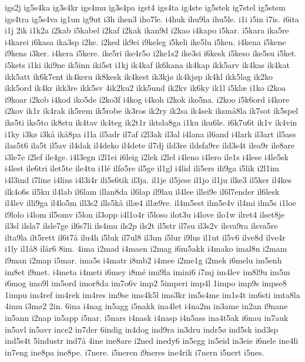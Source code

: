 igs2j
ig5s4ka
ig3s4kr
igs4mu
ig3s4pa
igst4
igs4ta
ig4ste
ig5stek
ig7stel
ig5stem
igs4tra
ig5s4va
ig1un
ig9ut
i3h
ihen3
iho7le.
i4huk
ihu9la
ihu5le.
i1i
i5in
i7is.
i6ita
i1j
2ik
i1k2a
i2kab
i5kabel
i2kaf
i2kak
ikan9d
i2kao
i4kapo
i5kar.
i5kara
ika5re
i4karei
i6kasa
ika3sp
i2ke.
i2ked
ik9ei
i9keleg
i5keli
ike5lu
i5ken.
i4kena
i5kene
i9kens
i3ker.
i4kera
i5kere.
ike5ri
ike4r5o
i2ke1s2
ike3si
i6kesk
i5keso
ike5su
i5ket.
i5kets
i1ki
iki9ne
ik5inn
iki5st
i1kj
ik4kaf
ik6kana
ik4kap
ikk5arv
ik4kas
ik4kat
ikk5att
ik6k7ent
ik4keru
ik8kesk
ik4kest
ik3kj^^f8
ik4kj^^f8p
ik4kl
ikk5lag
ik2ko
ikk5ord
ik4kr
ikk3re
ikk5sv
4ik2ku2
ikk5und
ik2kv
ik6ky
ik1l
i5kl^^e6
i1ko
i2koa
i9koar
i2kob
i4kod
iko5de
i2ko3f
i4kog
i4koh
i2kok
iko5na.
i2koo
i5k6ord
i4kore
i2kov
ik1r
ik4rak
ik5rem
ik5robe
ik3ros
ik2ry
ik2sa
ik4sek
iksm^^e58la
ik7sot
ik5spel
iks5ti
iks5to
ik8stu
ik4tav
ik4teg
ik2t1r
iktsla8ga
i1ku
iku6le.
i6k7u6t
ik1v
ik4vin
i1ky
i3k^^f8
i3k^^e5
ik^^e58pa
i1la
il5adr
il7af
i2l3ak
il3al
i4lana
il6and
i4lark
il3art
il5ass
ilas5t6
ila5t
il5av
il4dak
il4deko
il4dete
il7dj
ild3re
ildsfa9re
ild3s4t
ilea9r
ile8are
i3le7e
i2lef
ile4ge.
i4l3egn
i2l1ei
i6leig
i2lek
i2lel
i4leno
i4lero
ile1s
i4lese
i4le5sk
i4lest
ile6tri
ilet5te
ile4tu
i1l^^e9
ilf^^f85re
il5ge
il1gl
i4lid
ili5ers
ili9ga
i5lik
i2l1im
i4l3ind
i7line
i4lins
i4l3i4r
ili5s6tik
il3ja.
il1je
il5jese
il1jo
il1ju
ilke3
il5ker
il4kes
ilk4o6s
il5ku
il4lab
il6lam
illan8da
il6lap
il9lau
il4lee
illei9e
il6l7ender
il6lesk
il4lev
illi9ga
il4lo5m
ill3s2
ills5k^^e5
ill^^e64
ill^^e69re.
il4m5est
ilm5e4v
il4mi
ilm5s
i1loe
i9lolo
i4lom
il5omv
i5lon
il3opp
i4l1o4r
i5loso
ilot3u
i4love
ilo1w
ilret4
ilset8je
il3sl
ilsla7
ilsle7ge
il6s7li
ils4mu
ils2p
ils2t
il5str
il7su
il3s2v
ilsva9ra
ilsva5re
ilta9la
ilt5rett
il6t7^^e5
ilu4h
i5luk
il7ul8
il3un
i5lur
i9lus
il1ut
il5v6
ilve8d
ilve4r
i1ly
il1^^e58
il^^e5r6
8im.
4ima
i2mad
i4maen
i2mag
i6m5akk
i4mako
imal8n
i2mam
i9man
i2map
i5mar.
ima5s
i4matr
i8mb2
i4mee
i2me1g
i2mek
i6melu
im5enh
im8et
i9met.
i4meta
i4meti
i6mey
i8m^^e9
imi9la
imini6
i7mj
im4lev
im8l9u
im5m
i6mog
imo9l
im5ord
imor8da
im7o6v
imp2
5imperi
imp4l
1impo
imp9s
impse8
1impu
im4ref
im4rek
im4res
im9se
ims4k5l
ims3kr
im5s4me
im1s4t
im6sti
imta8la
4imu
i3m^^f82
2in.
6ina
i4nag
in5agg
i5nakk
ina4let
i4na2m
in3ame
in2an
i9nane
in5ann
i2nap
in5app
i5nar.
i5nars
i4nask
i4nasp
i4n5ass
ina4t5ak
i6nau
in7auk
in5avl
in5avr
ince2
in7der
6indig
in4dog
ind9ra
in3dru
indr5^^f8
ind5sk
ind3sp
ind5s4t
5industr
ind7^^e5
4ine
ine8are
i2ned
inedy6
in5egg
in5eid
in3eie
i6nele
ine4li
in7eng
ine8pa
ine8pe.
i7nere.
i5neren
i9neres
ine4rik
i7nern
i5nert
i5nes.
